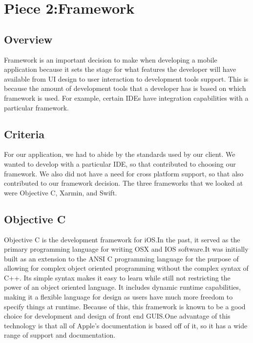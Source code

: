 \documentclass[onecolumn, draftclsnofoot,10pt, compsoc]{IEEEtran}
\begin{document}
\section{Piece 2:Framework}    
   \subsection{Overview}
    Framework is an important decision to make when developing a mobile application because it sets the stage for what features the developer will have available from UI design to user interaction to development tools support. This is because the amount of development tools that a developer has is based on which framework is used. For example, certain IDEs have integration capabilities with a particular framework.
    \subsection{Criteria}
   For our application, we had to abide by the standards used by our client. We wanted to develop with a particular IDE, so that contributed to choosing our framework. We also did not have a need for cross platform support, so that also contributed to our framework decision. The three frameworks that we looked at were Objective C, Xarmin, and Swift.
    \subsection{Objective C}
    Objective C is the development framework for iOS.In the past, it served as the primary programming language for writing OSX and IOS software.It was initially built as an extension to the ANSI C programming language for the purpose of allowing for complex object oriented programming without the complex syntax of C++. Its simple syntax makes it easy to learn while still not restricting the power of an object oriented language. It includes dynamic runtime capabilities, making it a flexible language for design as users have much more freedom to specify things at runtime. Because of this, this framework is known to be a good choice for development and design of front end GUIS.\cite{Objective C Interface}One advantage of this technology is that all of Apple's documentation is based off of it, so it has a wide range of support and documentation. \cite{Objective C}
\end{document}
